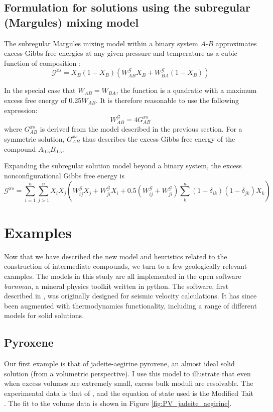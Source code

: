 \subsection{Formulation for solutions using the subregular (Margules) mixing model}

The subregular Margules mixing model within a binary system $A$-$B$ approximates excess Gibbs free energies at any given pressure and temperature as a cubic function of composition \citep{HW1989}:
\begin{equation}
  \mathcal{G}^{xs} = X_B (1-X_B) \left(W^{\mathcal{G}}_{AB} X_B + W^{\mathcal{G}}_{BA} (1-X_B) \right)
  \label{eqn:subreg}
\end{equation}

In the special case that $W_{AB} = W_{BA}$, the function is a quadratic with a maximum excess free energy of 0.25$W_{AB}$. It is therefore reasonable to use the following expression:
\begin{equation}
W^{\mathcal{G}}_{AB} = 4 G^{xs}_{AB}
\end{equation}
\noindent where $G^{xs}_{AB}$ is derived from the model described in the previous section. For a symmetric solution, $G^{xs}_{AB}$ thus describes the excess Gibbs free energy of the compound $A_{0.5}B_{0.5}$.


Expanding the subregular solution model beyond a binary system, the excess nonconfigurational Gibbs free energy is \citep{HW1989} 
\begin{equation}
  \mathcal{G}^{xs} = \sum_{i=1}^n \sum_{j>1}^n X_i X_j \left ( W^{\mathcal{G}}_{ij} X_j + W^{\mathcal{G}}_{ji} X_i + 0.5 (W^{\mathcal{G}}_{ij} + W^{\mathcal{G}}_{ji}) \sum_k^n (1-\delta_{ik})(1-\delta_{jk}) X_k \right)
  \label{xs}
\end{equation}

\section{Examples}
Now that we have described the new model and heuristics related to the construction of intermediate compounds, we turn to a few geologically relevant examples. The models in this study are all implemented in the open software \emph{burnman}, a mineral physics toolkit written in python. The software, first described in \cite{CHRU2014}, was originally designed for seismic velocity calculations. It has since been augmented with thermodynamics functionality, including a range of different models for solid solutions.


\subsection{Pyroxene}
Our first example is that of jadeite-aegirine pyroxene, an almost ideal solid solution (from a volumetric perspective). I use this model to illustrate that even when excess volumes are extremely small, excess bulk moduli are resolvable. The experimental data is that of \cite{NBLBT2006}, and the equation of state used is the Modified Tait \citep{HP2011}. The fit to the volume data is shown in Figure \ref{fig:PV_jadeite_aegirine}.

